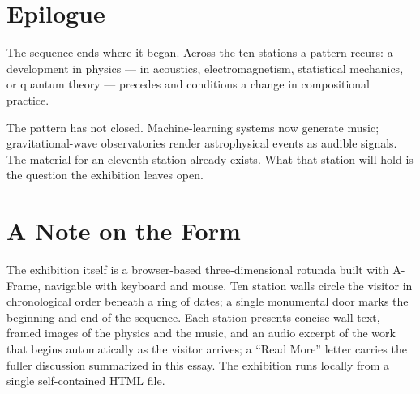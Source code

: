 \documentclass[11pt]{article}
\begin{document}
\section{Epilogue}

The sequence ends where it began. Across the ten stations a pattern recurs: a development in
physics --- in acoustics, electromagnetism, statistical mechanics, or quantum theory ---
precedes and conditions a change in compositional practice.

The pattern has not closed. Machine-learning systems now generate music; gravitational-wave
observatories render astrophysical events as audible signals. The material for an eleventh
station already exists. What that station will hold is the question the exhibition leaves
open.

\section*{A Note on the Form}

The exhibition itself is a browser-based three-dimensional rotunda built with A-Frame,
navigable with keyboard and mouse. Ten station walls circle the visitor in chronological
order beneath a ring of dates; a single monumental door marks the beginning and end of the
sequence. Each station presents concise wall text, framed images of the physics and the
music, and an audio excerpt of the work that begins automatically as the visitor arrives; a
``Read More'' letter carries the fuller discussion summarized in this essay. The exhibition
runs locally from a single self-contained HTML file.
\end{document}
